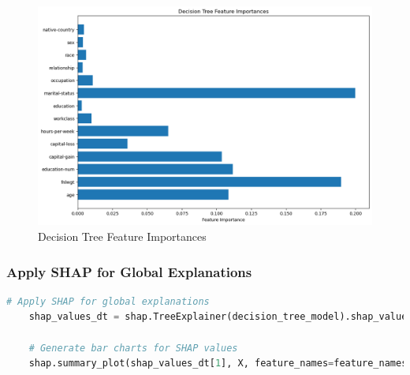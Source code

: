 \documentclass[10pt,journal,compsoc]{IEEEtran}
\begin{document}
\begin{figure}[H]
    \centering
    \includegraphics[width=1\linewidth]{images/decision_tree_feature_importances.png}
    \caption{Decision Tree Feature Importances}
    \label{fig:decision_tree_feature_importances}
\end{figure}

\subsubsection{Apply SHAP for Global Explanations}

\begin{lstlisting}[language=Python, caption={Apply Post-Hoc Explanations}, label=python_code, captionpos=b,  basicstyle=\scriptsize]
    # Apply SHAP for global explanations
    shap_values_dt = shap.TreeExplainer(decision_tree_model).shap_values(X)
    
    # Generate bar charts for SHAP values
    shap.summary_plot(shap_values_dt[1], X, feature_names=feature_names_simplified, class_names=['<=50K', '>50K'], plot_type='bar')
    
\end{lstlisting}
\end{document}
